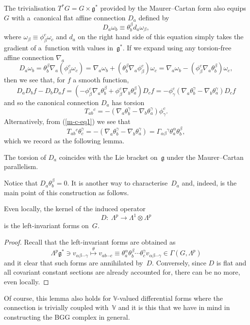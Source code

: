 The trivialisation $T^*G=G\times{\mathfrak{g}}^*$ provided by the Maurer--Cartan
form also equips $G$ with a~canonical f\/lat af\/f\/ine connection $D_a$ def\/ined
by
\[D_a\omega_b\equiv\theta_b^\beta d_a\omega_\beta,\]
where $\omega_\beta\equiv\phi_\beta^c\omega_c$ and
$d_a$ on the right hand side of this equation simply takes the
gradient of a~function with values in~${\mathfrak{g}}^*$. If we expand using
any torsion-free af\/f\/ine connection $\nabla_a$
\[D_a\omega_b=\theta_b^\beta \nabla_a(\phi_\beta^c\omega_c)
=\nabla_a\omega_b+(\theta_b^\beta \nabla_a\phi_\beta^c)\omega_c
=\nabla_a\omega_b-(\phi_\beta^c\nabla_a\theta_b^\beta)\omega_c,\]
then we see that, for $f$ a smooth function,
\[D_aD_bf-D_bD_af
=(-\phi_\beta^c \nabla_a\theta_b^\beta+\phi_\beta^c \nabla_b\theta_a^\beta)D_cf
=-\phi_\gamma^c(\nabla_a\theta_b^\gamma-\nabla_b\theta_a^\gamma)D_cf\]
and so the canonical connection $D_a$ has torsion
\[T_{ab}{}^c=-(\nabla_a\theta_b^\gamma-\nabla_b\theta_a^\gamma)\phi_\gamma^c.\]
Alternatively, from (\ref{m-c-eq1}) we see that
\[T_{ab}{}^c\theta_c^\gamma=-(\nabla_a\theta_b^\gamma-\nabla_b\theta_a^\gamma)
=\Gamma_{\alpha\beta}{}^\gamma\theta_a^\alpha\theta_b^\beta,\]
which we record as the following lemma.
\begin{lemma}\label{torsion_is_bracket}
The torsion of\/ $D_a$ coincides with
the Lie bracket on\/~${\mathfrak{g}}$ under the Maurer--Cartan parallelism.
\end{lemma}
Notice that $D_a\theta_b^\beta=0$. It is another way to
characterise~$D_a$ and, indeed, is the main point of this construction as
follows.
\begin{lemma} Even locally, the kernel of the induced operator
\[D: \ \Lambda^p\to\Lambda^1\otimes\Lambda^p\]
is the left-invariant forms on~$G$.
\end{lemma}
\begin{proof}
Recall that the left-invariant forms are obtained as
\[\Lambda^p{\mathfrak{g}}^*\ni v_{\alpha\beta\cdots\gamma}
\stackrel{\theta}{\longmapsto}v_{ab\cdots c}\equiv
\theta_a^\alpha\theta_b^\beta\cdots\theta_c^\gamma
v_{\alpha\beta\cdots\gamma}\in\Gamma(G,\Lambda^p)\]
and it clear that such forms are annihilated by~$D$. Conversely, since $D$ is
f\/lat and all covariant constant sections are already accounted for, there can
be no more, even locally.
\end{proof}
\begin{remark} Of course, this lemma also holds for ${\mathbb{V}}$-valued
dif\/ferential forms where the connection is trivially coupled
with~${\mathbb{V}}$ and it is this that we have in mind in constructing
the BGG complex in general.
\end{remark}
